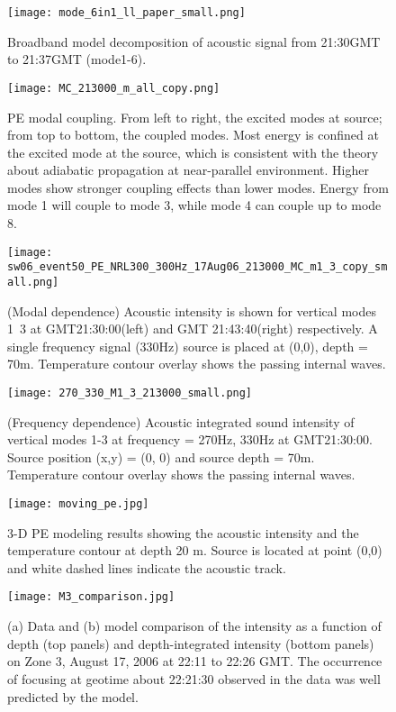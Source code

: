 \begin{figure}[H]
  \centering
  \texttt{[image: mode\_6in1\_ll\_paper\_small.png]}
  \caption{Broadband model decomposition of acoustic signal from 21:30GMT to 21:37GMT (mode1-6).}\label{fig:a2130}
\end{figure}

\begin{figure}[H]
  \centering
  \texttt{[image: MC\_213000\_m\_all\_copy.png]}
  \caption{PE modal coupling. From left to right, the excited modes at source; from top to bottom, the coupled modes. Most energy is confined at the excited mode at the source, which is consistent with the theory about adiabatic propagation at near-parallel environment.  Higher modes show stronger coupling effects than lower modes. Energy from mode 1 will couple to mode 3, while mode 4 can couple up to mode 8. }\label{fig:a2130}
\end{figure}


\begin{figure}[H]
  \centering
  \texttt{[image: sw06\_event50\_PE\_NRL300\_300Hz\_17Aug06\_213000\_MC\_m1\_3\_copy\_small.png]}
  \caption{(Modal dependence) Acoustic intensity is shown for vertical modes 1~3 at GMT21:30:00(left) and GMT 21:43:40(right) respectively.  A single frequency signal (330Hz) source is placed at (0,0), depth = 70m. Temperature contour overlay shows the passing internal waves. }\label{fig:a2130}
\end{figure}


\begin{figure}[H]
  \centering
  \texttt{[image: 270\_330\_M1\_3\_213000\_small.png]}
  \caption{(Frequency dependence) Acoustic integrated sound intensity of vertical modes 1-3 at frequency = 270Hz, 330Hz at GMT21:30:00. Source position (x,y) = (0, 0) and source depth = 70m. Temperature contour overlay shows the passing internal waves. }\label{fig:a2130}
\end{figure}



\begin{figure}[H]
  \centering
  \texttt{[image: moving\_pe.jpg]}
  \caption{3-D PE modeling results showing the acoustic intensity and the temperature contour at depth 20 m.  Source is located at point (0,0) and white dashed lines indicate the acoustic track. }\label{fig:a2130}
\end{figure}

\begin{figure}[H]
  \centering
  \texttt{[image: M3\_comparison.jpg]}
  \caption{(a) Data and (b) model comparison of the intensity as a function of depth (top panels) and depth-integrated intensity (bottom panels) on Zone 3, August 17, 2006 at 22:11 to 22:26 GMT.  The occurrence of focusing at geotime about 22:21:30 observed in the data was well predicted by the model.}\label{fig:a2130}
\end{figure}


